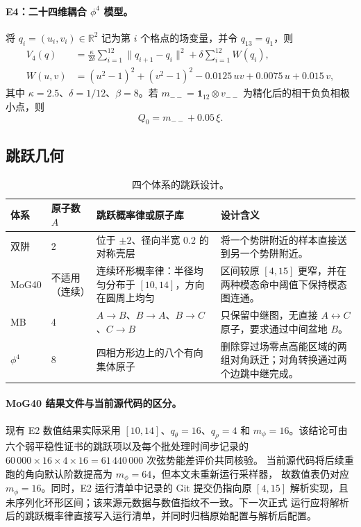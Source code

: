 \documentclass[11pt,a4paper]{article}
\begin{document}
\paragraph{E4：二十四维耦合 \texorpdfstring{$\phi^4$}{phi4} 模型。}
将 $q_i=(u_i,v_i)\in\mathbb R^2$ 记为第 $i$ 个格点的场变量，并令
$q_{13}=q_1$，则
\begin{align}
 V_4(q)
 &=\frac{\kappa}{2\delta}\sum_{i=1}^{12}\|q_{i+1}-q_i\|^2
 +\delta\sum_{i=1}^{12}W(q_i),\\
 W(u,v)
 &=(u^2-1)^2+(v^2-1)^2-0.0125\,uv+0.0075\,u+0.015\,v,
\end{align}
其中 $\kappa=2.5$、$\delta=1/12$、$\beta=8$。若
$m_{--}=\mathbf1_{12}\otimes v_{--}$ 为精化后的相干负负相极小点，则
\begin{equation}
 Q_0=m_{--}+0.05\,\xi .
\end{equation}

\subsection{跳跃几何}

\begin{table}[H]
\centering
\small
\begin{tabularx}{\textwidth}{L{2.2cm}C{1.0cm}L{4.1cm}Y}
\toprule
体系 & 原子数 $A$ & 跳跃概率律或原子库 & 设计含义 \\
\midrule
双阱 & 2 & 位于 $\pm2$、径向半宽 $0.2$ 的对称壳层 &
将一个势阱附近的样本直接送到另一个势阱附近。 \\
MoG40 & 不适用（连续） &
连续环形概率律：半径均匀分布于 $[10,14]$，方向在圆周上均匀 &
区间较原 $[4,15]$ 更窄，并在两种模态命中阈值下保持模态图连通。 \\
MB & 4 & $A\to B$、$B\to A$、$B\to C$、$C\to B$ &
只保留中继图，无直接 $A\leftrightarrow C$ 原子，要求通过中间盆地 $B$。 \\
$\phi^4$ & 8 & 四相方形边上的八个有向集体原子 &
删除穿过场零点高能区域的两组对角跃迁；对角转换通过两个边跳中继完成。 \\
\bottomrule
\end{tabularx}
\caption{四个体系的跳跃设计。}
\end{table}

\paragraph{MoG40 结果文件与当前源代码的区分。}
现有 E2 数值结果实际采用 $[10,14]$、$q_\theta=16$、$q_\rho=4$ 和
$m_\phi=16$。该结论可由六个弱平稳性证书的跳跃项以及每个批处理时间步记录的
$60\,000\times16\times4\times16=61\,440\,000$ 次弦势能差评价共同核验。
当前源代码将后续重跑的角向默认阶数提高为 $m_\phi=64$，但本文未重新运行采样器，
故数值表仍对应 $m_\phi=16$。同时，E2 运行清单中记录的 Git 提交仍指向原
$[4,15]$ 解析实现，且未序列化环形区间；该来源元数据与数值指纹不一致。下一次正式
运行应将解析后的跳跃概率律直接写入运行清单，并同时归档原始配置与解析后配置。
\end{document}
